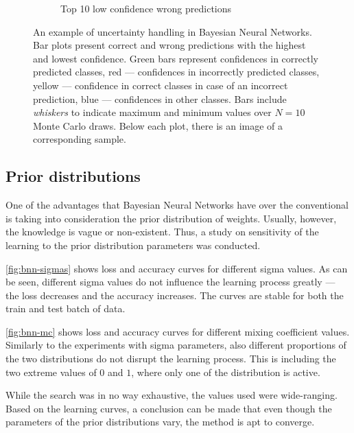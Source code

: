 \begin{figure}[h]
\begin{subfigure}[b]{\textwidth}
         \caption{Top 10 low confidence wrong predictions}
     \end{subfigure}
     \caption[Example of uncertainty handling in BNN]{An example of uncertainty handling in Bayesian Neural Networks. Bar plots present correct and wrong predictions with the highest and lowest confidence. Green bars represent confidences in correctly predicted classes, red — confidences in incorrectly predicted classes, yellow — confidence in correct classes in case of an incorrect prediction, blue — confidences in other classes. Bars include \textit{whiskers} to indicate maximum and minimum values over $N=10$ Monte Carlo draws. Below each plot, there is an image of a corresponding sample.}
    \label{fig:bnn-uncertainty}
\end{figure}

\subsection{Prior distributions}
One of the advantages that Bayesian Neural Networks have over the conventional is taking into consideration the prior distribution of weights. Usually, however, the knowledge is vague or non-existent. Thus, a study on sensitivity of the learning to the prior distribution parameters was conducted.

\vspace{\baselineskip}
\autoref{fig:bnn-sigmas} shows loss and accuracy curves for different sigma values. As can be seen, different sigma values do not influence the learning process greatly — the loss decreases and the accuracy increases. The curves are stable for both the train and test batch of data.

\vspace{\baselineskip}
\autoref{fig:bnn-mc} shows loss and accuracy curves for different mixing coefficient values. Similarly to the experiments with sigma parameters, also different proportions of the two distributions do not disrupt the learning process. This is including the two extreme values of $0$ and $1$, where only one of the distribution is active.




\vspace{\baselineskip}
While the search was in no way exhaustive, the values used were wide-ranging. Based on the learning curves, a conclusion can be made that even though the parameters of the prior distributions vary, the method is apt to converge.